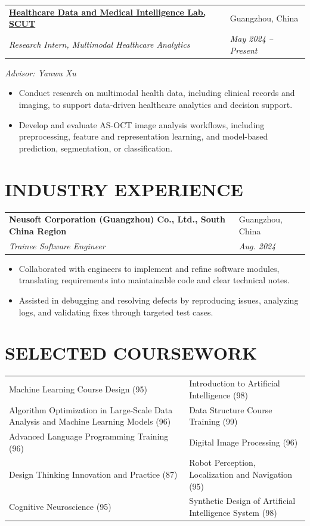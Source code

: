 \documentclass[a4paper,10pt]{extarticle}
\makeatletter
\newcommand{\roleentry}[4]{%
    \begin{tabularx}{\textwidth}{@{}>{\raggedright\arraybackslash}X>{\raggedleft\arraybackslash}p{1.35in}@{}}
        \textbf{#1} & #2\\
        \textit{#3} & \textit{#4}
    \end{tabularx}
}
\makeatother
\begin{document}
\roleentry{\href{http://hdmilab.cn/}{Healthcare Data and Medical Intelligence Lab, SCUT}}{Guangzhou, China}{Research Intern, Multimodal Healthcare Analytics}{May 2024 -- Present}
\textit{Advisor: Yanwu Xu}
\begin{itemize}
    \item Conduct research on multimodal health data, including clinical records and imaging, to support data-driven healthcare analytics and decision support.
    \item Develop and evaluate AS-OCT image analysis workflows, including preprocessing, feature and representation learning, and model-based prediction, segmentation, or classification.
\end{itemize}

\section*{INDUSTRY EXPERIENCE}
\roleentry{Neusoft Corporation (Guangzhou) Co., Ltd., South China Region}{Guangzhou, China}{Trainee Software Engineer}{Aug. 2024}
\begin{itemize}
    \item Collaborated with engineers to implement and refine software modules, translating requirements into maintainable code and clear technical notes.
    \item Assisted in debugging and resolving defects by reproducing issues, analyzing logs, and validating fixes through targeted test cases.
\end{itemize}

\section*{SELECTED COURSEWORK}
\begin{tabularx}{\textwidth}{>{\raggedright\arraybackslash}X>{\raggedright\arraybackslash}X}
Machine Learning Course Design (95) & Introduction to Artificial Intelligence (98)\\
Algorithm Optimization in Large-Scale Data Analysis and Machine Learning Models (96) & Data Structure Course Training (99) \\
Advanced Language Programming Training (96) & Digital Image Processing (96)\\
Design Thinking Innovation and Practice (87) & Robot Perception, Localization and Navigation (95)\\
Cognitive Neuroscience (95) & Synthetic Design of Artificial Intelligence System (98)
\end{tabularx}
\end{document}
